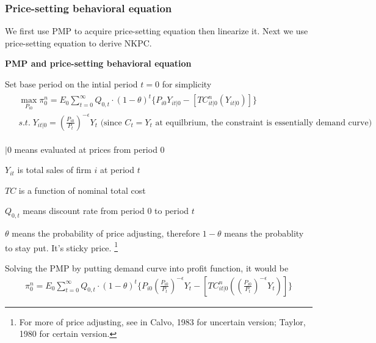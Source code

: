 \documentclass{article}
\begin{document}
\subsubsection{Price-setting behavioral equation}

We first use PMP to acquire price-setting equation then linearize it. Next we use price-setting equation to derive NKPC.

\textbf{PMP and price-setting behavioral equation}

Set base period on the intial period $t=0$ for simplicity
\begin{align}
\begin{split}&
\max_{P_{i0}}\pi_{0}^{n}=E_{0}\sum\limits_{t=0}^{\infty}Q_{0,t}\cdot (1-\theta)^{t}\{P_{i0}Y_{it | 0}-[T C^n_{it|0} (Y_{it|0})]\} 
\\&
s.t. \; Y_{it|0}=(\frac{P_{i0}}{P_{t}})^{-\epsilon}Y_{t} \text{ (since $C_t =Y_t$ at equilbrium, the constraint is essentially demand curve)}
\end{split}
\end{align}

$|0$ means evaluated at prices from period $0$

$Y_{it}$ is total sales of firm $i$ at period $t$

$TC$ is a function of nominal total cost

$Q_{0,t}$ means discount rate from period $0$ to period $t$

$\theta$ means the probability of price adjusting, therefore $1-\theta$ means the probablity to stay put. It's sticky price. 
\footnote{For more of price adjusting, see in Calvo, 1983 for uncertain version; Taylor, 1980 for certain version.}


Solving the PMP by putting demand curve into profit function, it would be
\begin{align}
\pi_{0}^{n}=E_{0}\sum\limits_{t=0}^{\infty}Q_{0,t}\cdot (1-\theta)^{t}\{P_{i0}(\frac{P_{i0}}{P_{t}})^{-\epsilon}Y_{t}-[T C^n_{it|0} ((\frac{P_{i0}}{P_{t}})^{-\epsilon}Y_{t})]\} 
\end{align}
\end{document}
